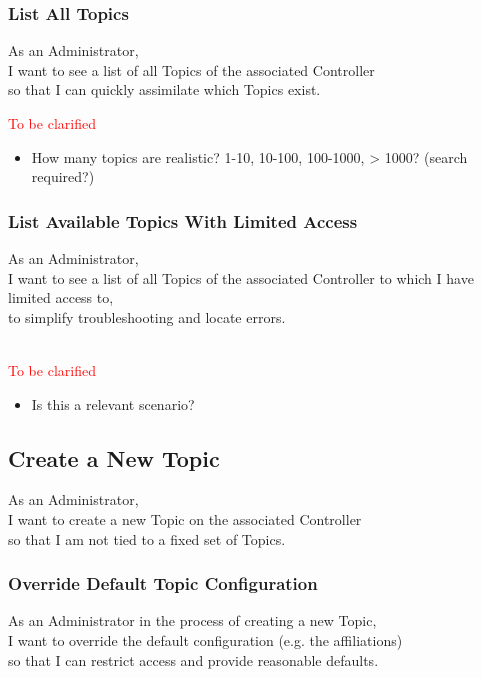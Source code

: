 \subsubsection{List All Topics}
As an Administrator,\\
I want to see a list of all Topics of the associated Controller\\
so that I can quickly assimilate which Topics exist.

\noindent\textcolor{red}{To be clarified}

\begin{itemize}
    \item How many topics are realistic? 1-10, 10-100, 100-1000, > 1000? (search required?)
\end{itemize}


\subsubsection{List Available Topics With Limited Access}

As an Administrator,\\
I want to see a list of all Topics of the associated Controller to which I have limited access to,\\
to simplify troubleshooting and locate errors.

\noindent\textcolor{red}{\\To be clarified}

\begin{itemize}
    \item Is this a relevant scenario?
\end{itemize}


\subsection{Create a New Topic}

As an Administrator,\\
I want to create a new Topic on the associated Controller\\
so that I am not tied to a fixed set of Topics.

\subsubsection{Override Default Topic Configuration}

As an Administrator in the process of creating a new Topic,\\
I want to override the default configuration (e.g. the affiliations) \\
so that I can restrict access and provide reasonable defaults.

